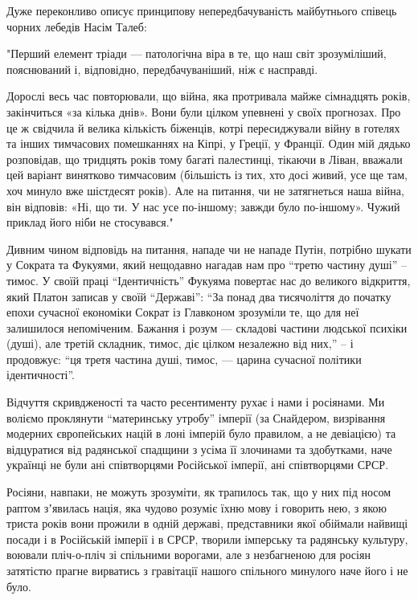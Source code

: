 Дуже переконливо описує принципову непередбачуваність майбутнього співець
чорних лебедів Насім Талеб: 

"Перший елемент тріади — патологічна віра в те, що наш світ зрозуміліший,
пояснюваний і, відповідно, передбачуваніший, ніж є насправді.

Дорослі весь час повторювали, що війна, яка протривала майже сімнадцять років,
закінчиться «за кілька днів». Вони були цілком упевнені у своїх прогнозах. Про
це ж свідчила й велика кількість біженців, котрі пересиджували війну в готелях
та інших тимчасових помешканнях на Кіпрі, у Греції, у Франції. Один мій дядько
розповідав, що тридцять років тому багаті палестинці, тікаючи в Ліван, вважали
цей варіант винятково тимчасовим (більшість із тих, хто досі живий, усе ще там,
хоч минуло вже шістдесят років). Але на питання, чи не затягнеться наша війна,
він відповів: «Ні, що ти. У нас усе по-іншому; завжди було по-іншому». Чужий
приклад його ніби не стосувався."

Дивним чином відповідь на питання, нападе чи не нападе Путін, потрібно шукати у
Сократа та Фукуями, який нещодавно нагадав нам про \enquote{третю частину душі} –
тимос. У своїй праці \enquote{Ідентичність} Фукуяма повертає нас до великого відкриття,
який Платон записав у своїй \enquote{Державі}: \enquote{За понад два тисячоліття до початку
епохи сучасної економіки Сократ із Главконом зрозуміли те, що для неї
залишилося непоміченим. Бажання і розум — складові частини людської психіки
(душі), але третій складник, тимос, діє цілком незалежно від них,} – і
продовжує: \enquote{ця третя частина душі, тимос, — царина сучасної політики
ідентичності}. 

Відчуття скривдженості та часто ресентименту рухає і нами і росіянами. Ми
воліємо проклянути \enquote{материнську утробу} імперії (за Снайдером, визрівання
модерних європейських націй в лоні імперій було правилом, а не девіацією) та
відцуратися від радянської спадщини з усіма її злочинами та здобутками, наче
українці не були ані співтворцями Російської імперії, ані співтворцями СРСР.

Росіяни, навпаки, не можуть зрозуміти, як трапилось так, що у них під носом
раптом зʼявилась нація, яка чудово розуміє їхню мову і говорить нею, з якою
триста років вони прожили в одній державі, представники якої обіймали найвищі
посади і в Російській імперії і в СРСР, творили імперську та радянську
культуру, воювали пліч-о-пліч зі спільними ворогами, але з незбагненою для
росіян затятістю прагне вирватись з гравітації нашого спільного минулого наче
його і не було.

